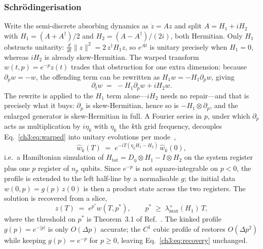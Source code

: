 \subsubsection{Schr\"odingerisation}
\label{ch3:sec:schro}

Write the semi-discrete absorbing dynamics as $\dot z = Az$ and split
$A = H_1 + iH_2$ with $H_1=(A+A^{\dagger})/2$ and
$H_2=(A-A^{\dagger})/(2i)$, both Hermitian.  Only $H_1$ obstructs
unitarity: $\tfrac{d}{dt}\|z\|^{2} = 2\,z^{\dagger}H_1z$, so $e^{At}$ is
unitary precisely when $H_1=0$, whereas $iH_2$ is already skew-Hermitian.
The warped transform $w(t,p)=e^{-p}z(t)$ trades that obstruction for one
extra dimension: because $\partial_p w = -w$, the offending term can be
rewritten as $H_1 w = -H_1\partial_p w$, giving
\begin{equation}
  \partial_t w \;=\; -H_1\partial_p w + iH_2 w .
  \label{ch3:eq:warped}
\end{equation}
The rewrite is applied to the $H_1$ term alone---$iH_2$ needs no
repair---and that is precisely what it buys: $\partial_p$ is
skew-Hermitian, hence so is $-H_1\otimes\partial_p$, and the enlarged
generator is skew-Hermitian in full.  A Fourier series in $p$, under
which $\partial_p$ acts as multiplication by $i\eta_k$ with $\eta_k$ the
$k$th grid frequency, decouples Eq.~\eqref{ch3:eq:warped} into unitary
evolutions per mode~\cite{jin2023schrodingerisation},
\begin{equation}
  \hat w_k(T) \;=\; e^{-iT(\eta_k H_1 - H_2)}\,\hat w_k(0),
  \label{ch3:eq:permode}
\end{equation}
i.e.\ a Hamiltonian simulation of
$H_{\mathrm{tot}} = D_\eta\otimes H_1 - I\otimes H_2$ on the system
register plus one $p$ register of $n_p$ qubits.  Since $e^{-p}$ is not
square-integrable on $p<0$, the profile is extended to the left half-line
by a normalisable $g$; the initial data $w(0,p)=g(p)\,z(0)$ is then a
product state across the two registers.  The
solution is recovered from a slice,
\begin{equation}
  z(T) \;=\; e^{p^{*}} w(T,p^{*}),
  \qquad
  p^{*} \;\ge\; \lambda^{+}_{\max}(H_1)\,T,
  \label{ch3:eq:recovery}
\end{equation}
where the threshold on $p^{*}$ is Theorem~3.1 of
Ref.~\cite{jin2024recovery}.  The kinked profile $g(p)=e^{-|p|}$ is only
$O(\Delta p)$ accurate; the $C^{1}$ cubic profile of
\cite[Remark~4.9]{jin2024recovery} restores $O(\Delta p^{2})$ while
keeping $g(p)=e^{-p}$ for $p\ge0$, leaving Eq.~\eqref{ch3:eq:recovery}
unchanged.

